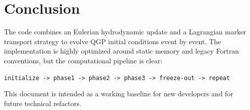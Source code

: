 \documentclass[11pt,a4paper]{article}
\begin{document}
\section{Conclusion}
The code combines an Eulerian hydrodynamic update and a Lagrangian marker
transport strategy to evolve QGP initial conditions event by event.
The implementation is highly optimized around static memory and legacy
Fortran conventions, but the computational pipeline is clear:
\begin{center}
\texttt{initialize -> phase1 -> phase2 -> phase3 -> freeze-out -> repeat}
\end{center}

This document is intended as a working baseline for new developers and for
future technical refactors.
\end{document}
